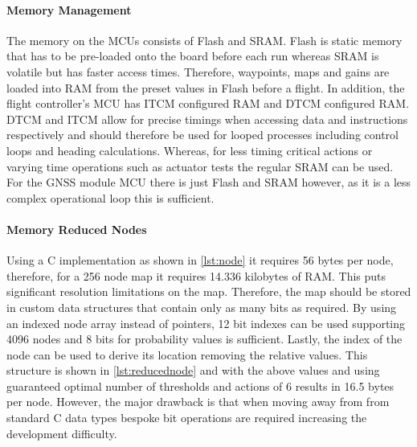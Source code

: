 \paragraph{Memory Management}
The memory on the \gls{MCU}s consists of Flash and \gls{SRAM}. Flash is static memory that has to be pre-loaded onto the board before each run whereas \gls{SRAM} is volatile but has faster access times. Therefore, waypoints, maps and gains are loaded into \gls{RAM} from the preset values in Flash before a flight. In addition, the flight controller's \gls{MCU} has \gls{ITCM} configured \gls{RAM} and \gls{DTCM} configured \gls{RAM}. \gls{DTCM} and \gls{ITCM} allow for precise timings when accessing data and instructions respectively and should therefore be used for looped processes including control loops and heading calculations. Whereas, for less timing critical actions or varying time operations such as actuator tests the regular \gls{SRAM} can be used. For the \gls{GNSS} module \gls{MCU} there is just Flash and \gls{SRAM} however, as it is a less complex operational loop this is sufficient. 

\paragraph{Memory Reduced Nodes}
Using a C implementation as shown in \ref{lst:node} it requires 56 bytes per node, therefore, for a 256 node map it requires 14.336 kilobytes of \gls{RAM}. This puts significant resolution limitations on the map. Therefore, the map should be stored in custom data structures that contain only as many bits as required. By using an indexed node array instead of pointers, 12 bit indexes can be used supporting 4096 nodes and 8 bits for probability values is sufficient. Lastly, the index of the node can be used to derive its location removing the relative values. This structure is shown in \ref{lst:reducednode} and with the above values and using guaranteed optimal number of thresholds and actions of 6 results in 16.5 bytes per node. However, the major drawback is that when moving away from from standard C data types bespoke bit operations are required increasing the development difficulty. 
